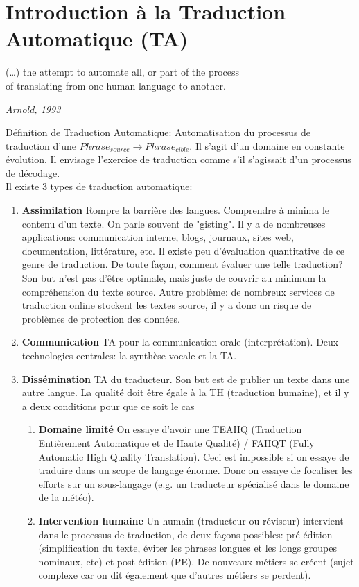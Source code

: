 \vspace{-1.2cm}

\section{Introduction à la Traduction Automatique (TA)}

\epigraph{(…) the attempt to automate all, or part of the process\\ of translating from one human language to another.}{\textit{Arnold, 1993}}

Définition de Traduction Automatique: Automatisation du processus de traduction d'une $Phrase_{source} \rightarrow Phrase_{cible}$.
Il s'agit d'un domaine en constante évolution. Il envisage l'exercice de traduction comme s'il s'agissait d'un processus de décodage. \\

\noindent Il existe 3 types de traduction automatique:

\begin{enumerate}
    \item \textbf{Assimilation} Rompre la barrière des langues. Comprendre à minima le contenu d'un texte.
    On parle souvent de "gisting". Il y a de nombreuses applications: communication interne, blogs, journaux,
    sites web, documentation, littérature, etc. Il existe peu d'évaluation quantitative de ce genre de traduction.
    De toute façon, comment évaluer une telle traduction? Son but n'est pas d'être optimale, mais juste de couvrir
    au minimum la compréhension du texte source. Autre problème: de nombreux services de traduction online stockent
    les textes source, il y a donc un risque de problèmes de protection des données.
    \item \textbf{Communication} TA pour la communication orale (interprétation). Deux technologies centrales: la synthèse vocale et la TA.
    \item \textbf{Dissémination} TA du traducteur. Son but est de publier un texte dans une autre langue.
    La qualité doit être égale à la TH (traduction humaine), et il y a deux conditions pour que ce soit le cas
    \begin{enumerate}
        \item \textbf{Domaine limité} On essaye d'avoir une TEAHQ (Traduction Entièrement Automatique et de Haute Qualité) / FAHQT (Fully Automatic High Quality Translation).
        Ceci est impossible si on essaye de traduire dans un scope de langage énorme.
        Donc on essaye de focaliser les efforts sur un sous-langage (e.g. un traducteur spécialisé dans le domaine de la météo).
        \item \textbf{Intervention humaine} Un humain (traducteur ou réviseur) intervient dans le processus de traduction,
        de deux façons possibles: pré-édition (simplification du texte, éviter les phrases longues et les longs groupes nominaux, etc)
        et post-édition (PE). De nouveaux métiers se créent (sujet complexe car on dit également que d'autres métiers se perdent).
    \end{enumerate}
\end{enumerate}

